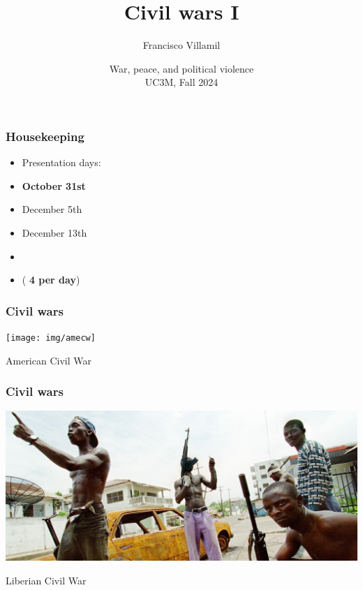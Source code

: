 \documentclass[aspectratio=43]{beamer}
\title{\huge Civil wars I}
\author{Francisco Villamil}
\date{War, peace, and political violence\\UC3M, Fall 2024}
\begin{document}
\begin{frame}
  \titlepage
\end{frame}

\begin{frame}
\frametitle{Housekeeping}
\centering

\begin{itemize}
  \item[] Presentation days:
  \item \textbf{October 31st}
  \item December 5th
  \item December 13th
  \item[]
  \item (\textbf{ 4 per day})
\end{itemize}


\end{frame}
  


\begin{frame}
\frametitle{Civil wars}
\centering

\texttt{[image: img/amecw]}

American Civil War

\end{frame}

\begin{frame}
\frametitle{Civil wars}
\centering

\includegraphics[width = \textwidth]{img/liberia}

Liberian Civil War

\end{frame}

\end{document}
